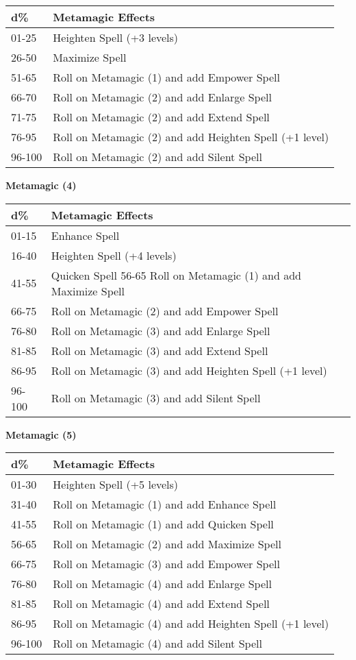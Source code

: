 \documentclass{article}
\begin{document}
\begin{tabular}{|>{\raggedright}p{38pt}|>{\raggedright}p{235pt}|}
\hline
d\textbf{\%} & M\textbf{etamagic Effects }\tabularnewline
\hline
01-25 & Heighten Spell (+3 levels) \tabularnewline
\hline
26-50 & Maximize Spell \tabularnewline
\hline
51-65 & Roll on Metamagic (1) and add Empower Spell \tabularnewline
\hline
66-70 & Roll on Metamagic (2) and add Enlarge Spell \tabularnewline
\hline
71-75 & Roll on Metamagic (2) and add Extend Spell \tabularnewline
\hline
76-95 & Roll on Metamagic (2) and add Heighten Spell (+1 level) \tabularnewline
\hline
96-100 & Roll on Metamagic (2) and add Silent Spell \tabularnewline
\hline
\end{tabular}

\vspace{12pt}
\textbf{Metamagic (4) }

\begin{tabular}{|>{\raggedright}p{38pt}|>{\raggedright}p{284pt}|}
\hline
d\textbf{\%} & M\textbf{etamagic Effects }\tabularnewline
\hline
01-15 & Enhance Spell \tabularnewline
\hline
16-40 & Heighten Spell (+4 levels)\tabularnewline
\hline
41-55 & Quicken Spell 56-65 Roll on Metamagic (1) and add Maximize Spell \tabularnewline
\hline
66-75 & Roll on Metamagic (2) and add Empower Spell \tabularnewline
\hline
76-80 & Roll on Metamagic (3) and add Enlarge Spell \tabularnewline
\hline
81-85 & Roll on Metamagic (3) and add Extend Spell \tabularnewline
\hline
86-95 & Roll on Metamagic (3) and add Heighten Spell (+1 level) \tabularnewline
\hline
96-100 & Roll on Metamagic (3) and add Silent Spell \tabularnewline
\hline
\end{tabular}

\vspace{12pt}
\textbf{Metamagic (5) }

\begin{tabular}{|>{\raggedright}p{38pt}|>{\raggedright}p{235pt}|}
\hline
d\textbf{\%} & M\textbf{etamagic Effects }\tabularnewline
\hline
01-30 & Heighten Spell (+5 levels) \tabularnewline
\hline
31-40 & Roll on Metamagic (1) and add Enhance Spell \tabularnewline
\hline
41-55 & Roll on Metamagic (1) and add Quicken Spell \tabularnewline
\hline
56-65 & Roll on Metamagic (2) and add Maximize Spell \tabularnewline
\hline
66-75 & Roll on Metamagic (3) and add Empower Spell \tabularnewline
\hline
76-80 & Roll on Metamagic (4) and add Enlarge Spell \tabularnewline
\hline
81-85 & Roll on Metamagic (4) and add Extend Spell \tabularnewline
\hline
86-95 & Roll on Metamagic (4) and add Heighten Spell (+1 level) \tabularnewline
\hline
96-100 & Roll on Metamagic (4) and add Silent Spell \tabularnewline
\hline
\end{tabular}
\end{document}
